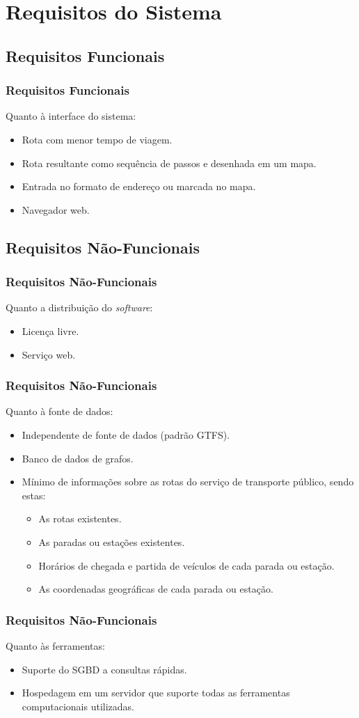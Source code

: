 \section{Requisitos do Sistema}

\subsection{Requisitos Funcionais}
\frame
{
\frametitle{Requisitos Funcionais}
Quanto à interface do sistema:
\begin{itemize}
	\item Rota com menor tempo de viagem.
	\item Rota resultante como sequência de passos e desenhada em um mapa.
	\item Entrada no formato de endereço ou marcada no mapa.
	\item Navegador web.
\end{itemize}
}

\subsection{Requisitos Não-Funcionais}
\frame
{
\frametitle{Requisitos Não-Funcionais}
Quanto a distribuição do \emph{software}:
\begin{itemize}
	\item Licença livre.
	\item Serviço web.
\end{itemize}
}

\frame
{
\frametitle{Requisitos Não-Funcionais}
Quanto à fonte de dados:
\begin{itemize}
	\item Independente de fonte de dados (padrão GTFS).
	\item Banco de dados de grafos.
	\item Mínimo de informações sobre as rotas do serviço de transporte público, sendo estas:
	\begin{itemize}
		\item As rotas existentes.
		\item As paradas ou estações existentes.
		\item Horários de chegada e partida de veículos de cada parada ou estação.
		\item As coordenadas geográficas de cada parada ou estação.
	\end{itemize}
\end{itemize}
}

\frame
{
\frametitle{Requisitos Não-Funcionais}
Quanto às ferramentas:
\begin{itemize}
	\item Suporte do SGBD a consultas rápidas.
	\item Hospedagem em um servidor que suporte todas as ferramentas computacionais utilizadas.
\end{itemize}
}